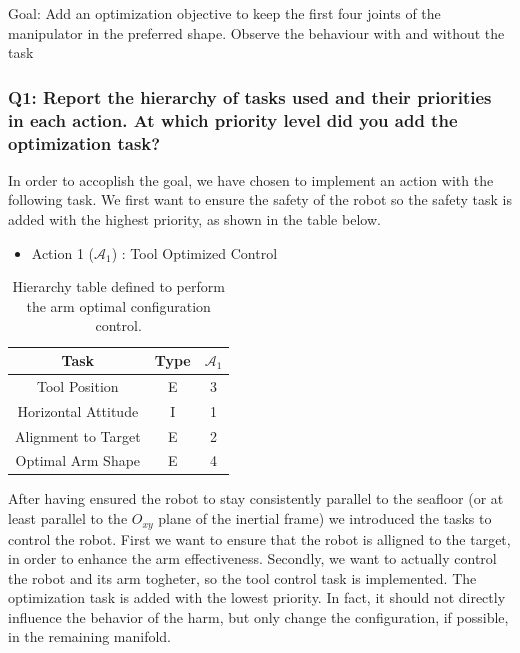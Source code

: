 \documentclass{article}
\begin{document}
Goal: Add an optimization objective to keep the first four joints of the manipulator in the preferred shape. Observe the behaviour with and without the task

\subsubsection{Q1: Report the hierarchy of tasks used and their priorities in each action. At which priority level did you add the optimization task?}

In order to accoplish the goal, we have chosen to implement an action with the following task. We first want to ensure the safety of the robot so the safety task is added with the highest priority, as shown in the table below. 

\begin{table}[htb]
	\caption{Hierarchy table defined to perform the arm optimal configuration control.}
	\begin{itemize}
		\item Action 1 ($\mathcal{A}_{1}$) : Tool Optimized Control
	\end{itemize}
	\label{tb7:ex5.1.1HierarchyTable}
	\begin{center}
		\footnotesize
		\begin{tabular}{ccc}
			\toprule
			Task & Type & $\mathcal{A}_{1}$  \\
			\midrule
			Tool Position                   & E & 3  \\
			\hdashline
			Horizontal Attitude             & I & 1  \\
			\hdashline
			Alignment to Target           	& E & 2  \\
			\hdashline
			Optimal Arm Shape				& E & 4  \\
			\bottomrule
		\end{tabular}
	\end{center}
\end{table}


After having ensured the robot to stay consistently parallel to the seafloor (or at least parallel to the $ O_{xy} $ plane of the inertial frame) we introduced the tasks to control the robot. First we want to ensure that the robot is alligned to the target, in order to enhance the arm effectiveness. Secondly, we want to actually control the robot and its arm togheter, so the tool control task is implemented. The optimization task is added with the lowest priority. In fact, it should not directly influence the behavior of the harm, but only change the configuration, if possible, in the remaining manifold. 
\end{document}
